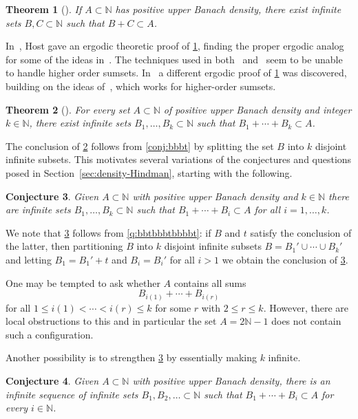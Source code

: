 \documentclass[10pt,dvipsnames]{article}
\newtheorem{theorem}{Theorem}[section]
\newtheorem{conjecture}[theorem]{Conjecture}
\theoremstyle{definition}
\theoremstyle{plain}
\newcommand{\N}{\mathbb{N}}
\begin{document}
\begin{theorem}[\cite{MRR}]
\label{thm:MRR}
If $A\subset\N$ has positive upper Banach density, there exist infinite sets $B, C\subset\N$ such that $B+C \subset A$.
\end{theorem}
In~\cite{Host}, Host gave an ergodic theoretic proof of \cref{thm:MRR}, finding the proper ergodic analog for some of the ideas in~\cite{MRR}.
The techniques used in both~\cite{MRR} and~\cite{Host} seem to be unable to handle higher order sumsets.
In~\cite{KMRR} a different ergodic proof of \cref{thm:MRR} was discovered, building on the ideas of~\cite{Host}, which works for higher-order sumsets.

\begin{theorem}[{\cite[Theorem 1.1]{KMRR}}]
\label{thm_BCD}
For every set  $A\subset\N$ of positive upper Banach density and integer $k\in\N$, there exist infinite sets $B_1, \dots, B_k\subset\N$ such that $B_1+\cdots+B_k \subset A$.
\end{theorem}
The conclusion of \cref{thm_BCD} follows from \cref{conj:bbbt} by splitting the set $B$ into $k$ disjoint infinite subsets.
This motivates several variations of the conjectures and questions posed in Section~\ref{sec:density-Hindman}, 
starting with the following.

\begin{conjecture}
\label{conj_B1uptoBk}
Given $A\subset\N$ with positive upper Banach density and $k\in\N$ there are infinite sets $B_1,\dots,B_k\subset\N$ such that $B_1+\cdots+B_i\subset A$ for all  $i=1,\dots,k$.
\end{conjecture}

We note that \cref{conj_B1uptoBk} follows from \cref{q:bbtbbbtbbbbt}: if $B$ and $t$ satisfy the conclusion of the latter, then partitioning $B$ into $k$ disjoint infinite subsets $B=B_1'\cup\cdots\cup B_k'$ and letting $B_1=B_1'+t$ and $B_i=B_i'$ for all $i>1$ we obtain the conclusion of \cref{conj_B1uptoBk}.

One may be tempted to ask whether $A$ contains all sums
\[
B_{i(1)} + \cdots + B_{i(r)}
\]
for all $1 \le i(1) < \cdots < i(r) \le k$ 
for some $r$ with $2\leq r \leq k$.
However, there are local obstructions to this and in particular the set $A=2\N-1$ does not contain such a configuration.


Another possibility is to strengthen \cref{conj_B1uptoBk} by essentially making $k$ infinite.
\begin{conjecture}
    \label{question_infiniteBi}
Given $A\subset\N$ with positive upper Banach density, there is an infinite sequence of infinite sets $B_1,B_2, \ldots \subset\N$ such that $B_1+\cdots+B_i\subset A$ for every $i\in\N$.
\end{conjecture}
\end{document}
